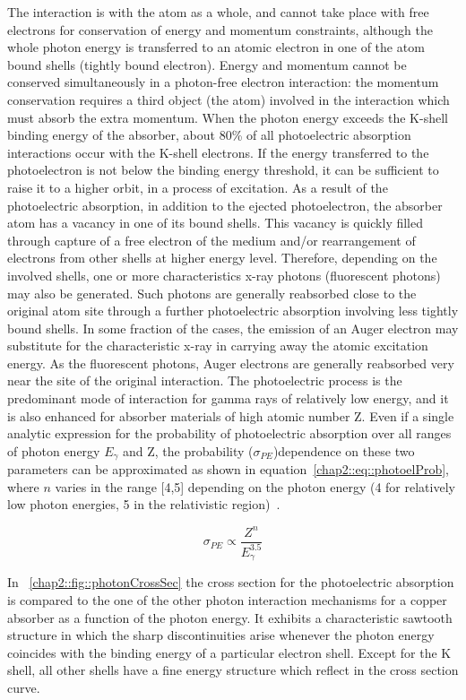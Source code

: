 The interaction is with the atom as a whole, and cannot take place with free electrons for conservation of energy and momentum constraints, although the whole photon energy is transferred to an atomic electron in one of the atom bound shells (tightly bound electron). Energy and momentum cannot be conserved simultaneously in a photon-free electron interaction: the momentum conservation requires a third object (the atom) involved in the interaction which must absorb the extra momentum. When the photon energy exceeds the K-shell binding energy of the absorber, about 80\% of all photoelectric absorption interactions occur with the K-shell electrons. If the energy transferred to the photoelectron is not below the binding energy threshold, it can be sufficient to raise it to a higher orbit, in a process of excitation. 
As a result of the photoelectric absorption, in addition to the ejected photoelectron, the absorber atom has a vacancy in one of its bound shells. This vacancy is quickly filled through capture of a free electron of the medium and/or rearrangement of electrons from other shells at higher energy level. Therefore, depending on the involved shells, one or more characteristics x-ray photons (fluorescent photons) may also be generated. Such photons are generally reabsorbed close to the original atom site through a further photoelectric absorption involving less tightly bound shells. In some fraction of the cases, the emission of an Auger electron may substitute for the characteristic x-ray in carrying away the atomic excitation energy. As the fluorescent photons, Auger electrons are generally reabsorbed very near the site of the original interaction.
The photoelectric process is the predominant mode of interaction for gamma rays of relatively low energy, and it is also enhanced for absorber materials of high atomic number Z. Even if a single analytic expression for the probability of photoelectric absorption over all ranges of photon energy $E_{\gamma}$ and Z, the probability ($\sigma_{PE}$)dependence on these two parameters can be approximated as shown in equation~\ref{chap2::eq::photoelProb}, where $n$ varies in the range [4,5] depending on the photon energy (4 for relatively low photon energies, 5 in the relativistic region)~\parencite{Knoll2000}.

\begin{equation}
\sigma_{PE} \varpropto \frac{Z^n}{E^{3.5}_{\gamma}} 
\label{chap2::eq::photoelProb}
\end{equation}  
 
In \figurename~\ref{chap2::fig::photonCrossSec} the cross section for the photoelectric absorption is compared to the one of the other photon interaction mechanisms for a copper absorber as a function of the photon energy. It exhibits a characteristic sawtooth structure in which the sharp discontinuities arise whenever the photon energy coincides with the binding energy of a particular electron shell. Except for the K shell, all other shells have a fine energy structure which reflect in the cross section curve.  

